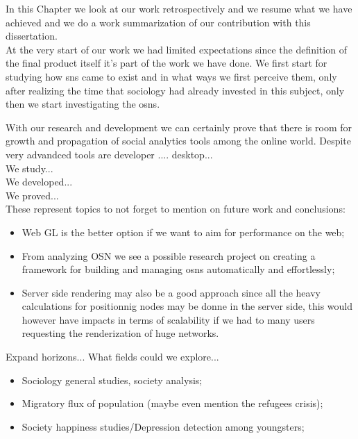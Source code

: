 In this Chapter we look at our work retrospectively and we resume what we have achieved and we do a work summarization of our contribution with this
dissertation.\\
\indent At the very start of our work we had limited expectations since the definition of the final product itself it's part of the work we have done. We first start for studying how \glspl{sn} came to exist and in what ways we first perceive them, only after realizing the time that sociology had already invested in this subject, only then we start investigating the \glspl{osn}.


With our research and development we can certainly prove that there is room for growth and propagation of social analytics tools among the online world. Despite very advandced tools are developer .... desktop...
\\
We study...\\
We developed...\\
We proved...\\

These represent topics to not forget to mention on future work and conclusions:
\begin{itemize}
    \item Web GL is the better option if we want to aim for performance on the web;
    \item From analyzing OSN we see a possible research project on creating a framework for building
    and managing \glspl{osn} automatically and effortlessly;
    \item Server side rendering may also be a good approach since all the heavy calculations for positionnig nodes
    may be donne in the server side, this would however have impacts in terms of scalability if we had to many users requesting
    the renderization of huge networks.
\end{itemize}

Expand horizons... What fields could we explore...\\
\begin{itemize}
    \item Sociology general studies, society analysis;
    \item Migratory flux of population (maybe even mention the refugees crisis);
    \item Society happiness studies/Depression detection among youngsters;
\end{itemize}
